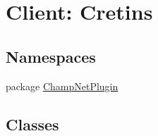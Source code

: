 \hypertarget{group__client}{\section{Client\-: Cretins}
\label{group__client}
}
\subsection*{Namespaces}
\begin{DoxyCompactItemize}
\item 
package \hyperlink{namespace_champ_net_plugin}{Champ\-Net\-Plugin}
\end{DoxyCompactItemize}
\subsection*{Classes}
